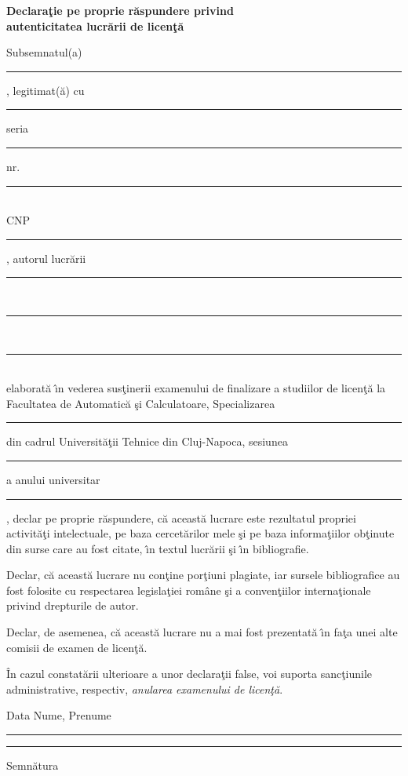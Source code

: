 \documentclass[12pt,a4paper,twoside]{report}
\newcommand{\uline}[1]{\rule[0pt]{#1}{0.4pt}}
\begin{document}
\begin{center}
{\bf
Declara\c{t}ie pe proprie r\u{a}spundere privind\\ 
autenticitatea lucr\u{a}rii de licen\c{t}\u{a}}
\end{center}
\vspace{1cm}



Subsemnatul(a) \\
\uline{14.8cm}, 
legitimat(\u{a}) cu \uline{4cm} seria \uline{3cm} nr. \uline{4cm}\\
CNP \uline{9cm}, autorul lucr\u{a}rii \uline{2.8cm}\\
\uline{16cm}\\
\uline{16cm}\\
elaborat\u{a} \^{\i}n vederea sus\c{t}inerii examenului de finalizare a studiilor de licen\c{t}\u{a} la Facultatea de Automatic\u{a} \c{s}i Calculatoare, Specializarea \uline{7cm} din cadrul Universit\u{a}\c{t}ii Tehnice din Cluj-Napoca, sesiunea \uline{4cm} a anului universitar \uline{3cm}, declar pe proprie r\u{a}spundere, c\u{a} aceast\u{a} lucrare este rezultatul propriei activit\u{a}\c{t}i intelectuale, pe baza cercet\u{a}rilor mele \c{s}i pe baza informa\c{t}iilor ob\c{t}inute din surse care au fost citate, \^{\i}n textul lucr\u{a}rii \c{s}i \^{\i}n bibliografie.

Declar, c\u{a} aceast\u{a} lucrare nu con\c{t}ine por\c{t}iuni plagiate, iar sursele bibliografice au fost folosite cu 
respectarea legisla\c{t}iei rom\^{a}ne \c{s}i a conven\c{t}iilor interna\c{t}ionale privind drepturile de autor.

Declar, de asemenea, c\u{a} aceast\u{a} lucrare nu a mai fost prezentat\u{a} \^{\i}n fa\c{t}a unei alte comisii de examen de licen\c{t}\u{a}.

\^{I}n cazul constat\u{a}rii ulterioare a unor declara\c{t}ii false, voi suporta sanc\c{t}iunile administrative, respectiv, \emph{anularea examenului de licen\c{t}\u{a}}.

\vspace{1.5cm}

Data \hspace{8cm} Nume, Prenume

\vspace{0.5cm}

\uline{3cm} \hspace{5cm} \uline{5cm}

\vspace{0.5cm}
\hspace{9.4cm}Semn\u{a}tura
\end{document}
